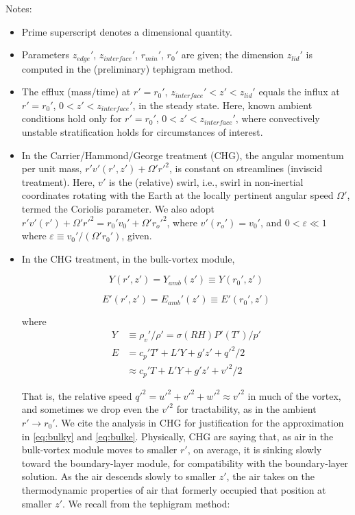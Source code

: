 \documentclass[preprint, prX]{revtex4}
\newcommand{\rmin}{r_{min}}
\newcommand{\zedge}{z_{edge}}
\newcommand{\zinter}{z_{interface}}
\begin{document}
Notes:
\begin{itemize}

\item Prime superscript denotes a dimensional quantity.
\item Parameters $\zedge'$, $\zinter'$, $\rmin'$, $r_0'$ are given; the dimension $z_{lid}'$ is computed in the (preliminary) tephigram method.
\item The efflux (mass/time) at $r' = r_0'$, $\zinter' < z' < z_{lid}'$ equals the influx at $r'=r_0'$, $0 < z' < \zinter'$, in the steady state. Here, known ambient conditions hold only for $r' = r_0'$, $0 < z' < \zinter'$, where convectively unstable stratification holds for circumstances of interest.

\item In the Carrier/Hammond/George treatment (CHG), the angular momentum per unit mass, $r' v'(r', z') + \Omega' r'^2$, is constant on streamlines (inviscid treatment). Here, $v'$ is the (relative) swirl, i.e., swirl in non-inertial coordinates rotating with the Earth at the locally pertinent angular speed $\Omega'$, termed the Coriolis parameter. We also adopt $r' v' (r') + \Omega' r'^2 = r_0' v_0' + \Omega' r_o'^2$, where $v'(r_o') = v_0'$, and $0 < \varepsilon \ll 1$ where $\varepsilon \equiv v_0' / (\Omega' r_0')$, given.

\item In the CHG treatment, in the bulk-vortex module,

\begin{equation}
	Y(r', z') = Y_{amb}(z') \equiv Y(r_0', z')
	\label{eq:bulky}
\end{equation}

\begin{equation}
	E'(r',z') = E_{amb}'(z') \equiv E'(r_0', z')
	\label{eq:bulke}
\end{equation}

where 
\begin{equation}
\begin{split}
	Y &\equiv \rho_v' / \rho' = \sigma(RH) P'(T')/ p' \\
	E &= c_p' T' + L' Y + g'z' + q'^2 /2 \\
	&\approx c_p' T + L'Y + g'z' + v'^2 / 2
\end{split}
\end{equation}

That is, the relative speed $q'^2 = u'^2 + v'^2 + w'^2 \approx v'^2$ in much of the vortex, and sometimes we drop even the $v'^2$ for tractability, as in the ambient $r' \to r_0'$. We cite the analysis in CHG for justification for the approximation in \eqref{eq:bulky} and \eqref{eq:bulke}. Physically, CHG are saying that, as air in the bulk-vortex module moves to smaller $r'$, on average, it is sinking slowly toward the boundary-layer module, for compatibility with the boundary-layer solution. As the air descends slowly to smaller $z'$, the air takes on the thermodynamic properties of air that formerly occupied that position at smaller $z'$. We recall from the tephigram method:


\end{itemize}
\end{document}
